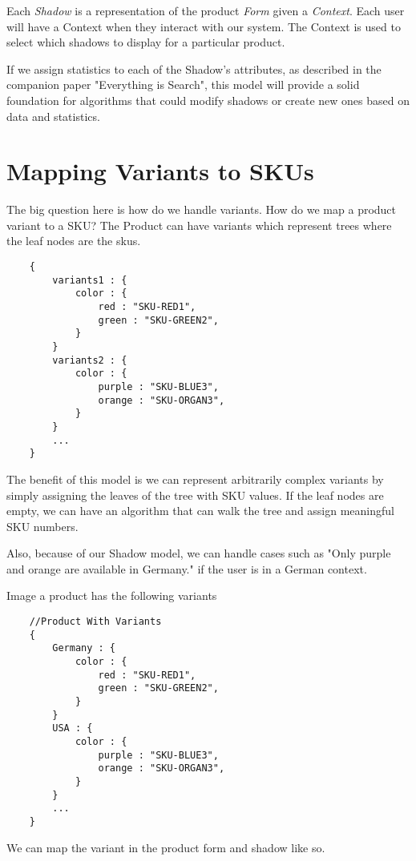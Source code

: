 \documentclass[11pt]{article}
\begin{document}
Each \emph{Shadow} is a representation of the product \emph{Form} given a \emph{Context}. Each user
will have a Context when they interact with our system. The Context is used
to select which shadows to display for a particular product.

If we assign statistics to each of the Shadow's attributes, as described in 
the companion paper "Everything is Search", this model will provide a solid
foundation for algorithms that could modify shadows or create new ones based on 
data and statistics.

\newpage
\section{Mapping Variants to SKUs}

The big question here is how do we handle variants. How do we map a product variant to a SKU? 
The Product can have variants which represent trees where the leaf nodes are
the skus.

\begin{lstlisting}
    {
        variants1 : {
            color : {
                red : "SKU-RED1",
                green : "SKU-GREEN2",
            }
        }
        variants2 : {
            color : {
                purple : "SKU-BLUE3",
                orange : "SKU-ORGAN3",
            }
        }
        ...
    }
\end{lstlisting}

The benefit of this model is we can represent arbitrarily complex variants 
by simply assigning the leaves of the tree with SKU values. If the leaf nodes are
empty, we can have an algorithm that can walk the tree and assign meaningful
SKU numbers.

Also, because of our Shadow model, we can handle cases such as "Only purple and orange
are available in Germany." if the user is in a German context. 

Image a product has the following variants

\begin{lstlisting}
    //Product With Variants
    {
        Germany : {
            color : {
                red : "SKU-RED1",
                green : "SKU-GREEN2",
            }
        }
        USA : {
            color : {
                purple : "SKU-BLUE3",
                orange : "SKU-ORGAN3",
            }
        }
        ...
    }
\end{lstlisting}
We can map the variant in the product form and shadow like so.
\end{document}
